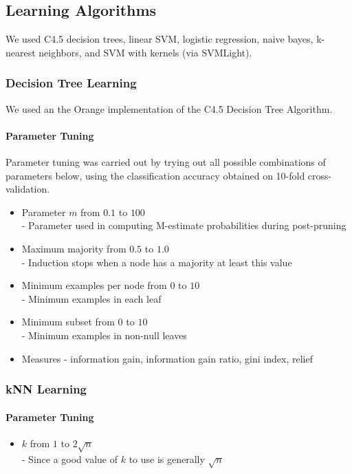 \documentclass[11pt,letter]{article}
\begin{document}
\subsection{Learning Algorithms}
We used C4.5 decision trees, linear SVM, logistic regression, naive bayes, k-nearest neighbors, and SVM with kernels (via SVMLight).

\subsubsection{Decision Tree Learning}

We used an the Orange implementation of the C4.5 Decision Tree Algorithm.

\paragraph{Parameter Tuning}
Parameter tuning was carried out by trying out all possible combinations of parameters below, using the classification accuracy obtained on 10-fold cross-validation.

\begin{itemize}
	\item Parameter $m$ from $0.1$ to $100$ \\
		- Parameter used in computing M-estimate probabilities during post-pruning
	\item Maximum majority from $0.5$ to $1.0$ \\
		- Induction stops when a node has a majority at least this value
	\item Minimum examples per node from $0$ to $10$ \\
		- Minimum examples in each leaf
	\item Minimum subset from $0$ to $10$ \\
		- Minimum examples in non-null leaves
	\item Measures - information gain, information gain ratio, gini index, relief %
\end{itemize}

\subsubsection{kNN Learning}

\paragraph{Parameter Tuning}
\begin{itemize}
	\item $k$ from $1$ to $2\sqrt{n}$ \\
		- Since a good value of $k$ to use is generally $\sqrt{n}$
\end{itemize}
\end{document}
